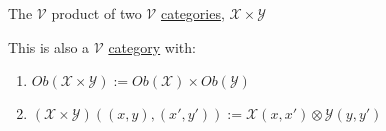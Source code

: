 The $\mathcal{V}$ product of two $\mathcal{V}$ \href{doc/1 math/Seven Sketches in Compositionality/Chapter 2: Resource theories/3 Enrichment/1 V-categories/1 V-category}{categories}, $\mathcal{X} \times \mathcal{Y}$

This is also a $\mathcal{V}$ \href{doc/1 math/Seven Sketches in Compositionality/Chapter 2: Resource theories/3 Enrichment/1 V-categories/1 V-category}{category} with:
\begin{enumerate}
  \item $Ob(\mathcal{X}\times\mathcal{Y}) := Ob(\mathcal{X})\times Ob(\mathcal{Y})$
  \item $(\mathcal{X} \times \mathcal{Y})((x,y),(x',y')) := \mathcal{X}(x,x') \otimes \mathcal{Y}(y,y')$
\end{enumerate}
